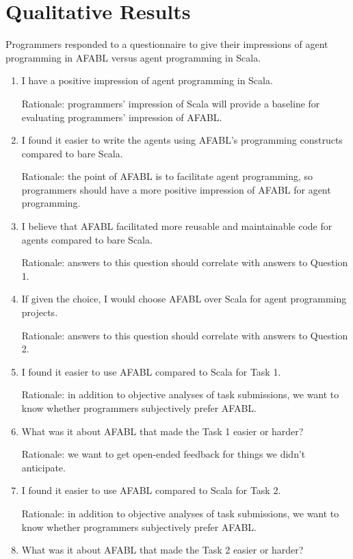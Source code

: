 \section{Qualitative Results}

Programmers responded to a questionnaire to give their impressions of agent programming in AFABL versus agent programming in Scala.

\begin{enumerate}
\item I have a positive impression of agent programming in Scala.

Rationale: programmers’ impression of Scala will provide a baseline for evaluating
programmers’ impression of AFABL.

\item I found it easier to write the agents using AFABL’s programming constructs compared to bare Scala.

Rationale: the point of AFABL is to facilitate agent programming, so programmers should have a more positive impression of AFABL for agent programming.

\item I believe that AFABL facilitated more reusable and maintainable code for agents compared to bare Scala.

Rationale: answers to this question should correlate with answers to Question 1.

\item If given the choice, I would choose AFABL over Scala for agent programming projects.

Rationale: answers to this question should correlate with answers to Question 2.

\item I found it easier to use AFABL compared to Scala for Task 1.

  Rationale: in addition to objective analyses of task submissions, we want to know whether programmers subjectively prefer AFABL.

\item What was it about AFABL that made the Task 1 easier or harder?

Rationale: we want to get open-ended feedback for things we didn’t anticipate.

\item I found it easier to use AFABL compared to Scala for Task 2.

Rationale: in addition to objective analyses of task submissions, we want to know whether programmers subjectively prefer AFABL.

\item What was it about AFABL that made the Task 2 easier or harder?

\end{enumerate}

